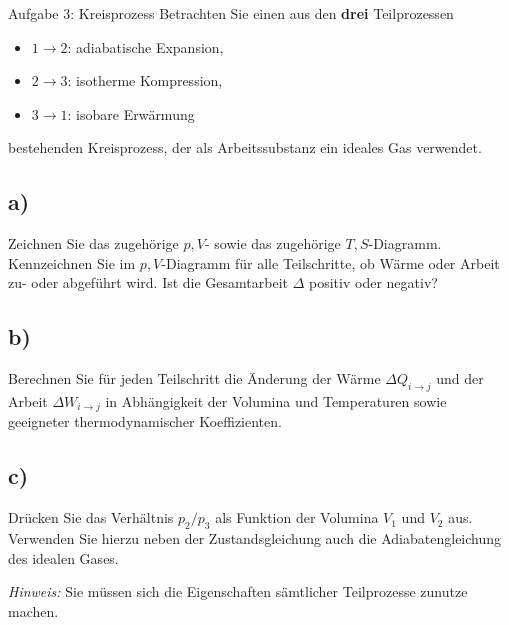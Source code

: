 \begin{aufgabe}{Aufgabe 3: Kreisprozess}
    Betrachten Sie einen aus den \textbf{drei} Teilprozessen
    \begin{itemize}
        \item $1 \to 2$: adiabatische Expansion,
        \item $2 \to 3$: isotherme Kompression,
        \item $3 \to 1$: isobare Erwärmung
    \end{itemize}
    bestehenden Kreisprozess, der als Arbeitssubstanz ein ideales Gas verwendet.

    \subsection{a)}
    Zeichnen Sie das zugehörige $p,V$- sowie das zugehörige $T,S$-Diagramm.
    Kennzeichnen Sie im $p,V$-Diagramm für alle Teilschritte, ob Wärme oder Arbeit zu- oder abgeführt wird.
    Ist die Gesamtarbeit $\Delta$ positiv oder negativ?

    \subsection{b)}
    Berechnen Sie für jeden Teilschritt die Änderung der Wärme $\Delta Q_{i \to j}$ und der Arbeit $\Delta W_{i \to j}$ in Abhängigkeit der Volumina und Temperaturen sowie geeigneter thermodynamischer Koeffizienten.

    \subsection{c)}
    Drücken Sie das Verhältnis $p_2 / p_3$ als Funktion der Volumina $V_1$ und $V_2$ aus.
    Verwenden Sie hierzu neben der Zustandsgleichung auch die Adiabatengleichung des idealen Gases.

    \textit{Hinweis:} Sie müssen sich die Eigenschaften sämtlicher Teilprozesse zunutze machen.
\end{aufgabe}

